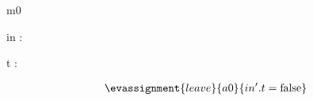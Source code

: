 \documentclass[12pt]{amsart}
\title{}
\author{}
\date{} %
\begin{document}
\maketitle
\tableofcontents


\begin{machine}{m0}


%
	\begin{variable}
		in : \set[\TRAIN]
	\end{variable}
%




\begin{dummy}
	t : \TRAIN
\end{dummy}

%

\begin{align*}
\evassignment{leave}{a0}
{	in'.t = \false	}
\end{align*}

\begin{use:set}{\TRAIN} \end{use:set}

\end{machine}
\end{document}
